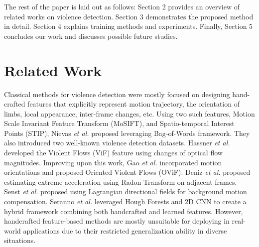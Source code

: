 \documentclass[conference]{IEEEtran}
\begin{document}
The rest of the paper is laid out as follows: Section 2
provides an overview of related works on violence
detection. Section 3 demonstrates the proposed method in detail. Section 4 explains training methods and experiments. Finally, Section 5 concludes our work and discusses possible future studies.



\section{Related Work}

Classical methods for violence detection were mostly focused on designing hand-crafted features that explicitly represent motion trajectory, the orientation of limbs, local appearance, inter-frame changes, etc. Using two such features, Motion Scale Invariant Feature Transform (MoSIFT), and Spatio-temporal Interest Points (STIP), Nievas \emph{et al.} \cite{nievas2011violence} proposed leveraging Bag-of-Words framework. They also introduced two well-known violence detection datasets. Hassner \emph{et al.} \cite{hassnerViF} developed the Violent Flows (ViF) feature using changes of optical flow magnitudes. Improving upon this work, Gao \emph{et al.} \cite{gao2016violence} incorporated motion orientations and proposed Oriented Violent Flows (OViF). Deniz \emph{et al.} \cite{deniz2014fast} proposed estimating extreme acceleration using Radon Transform on adjacent frames. Senst \emph{et al.} \cite{Senst2017CrowdVD} proposed using Lagrangian directional fields for background motion compensation. Seranno \emph{et al.} \cite{serrano2018fight} leveraged Hough Forests and 2D CNN to create a hybrid framework combining both handcrafted and learned features. However, handcrafted feature-based methods are mostly unsuitable for deploying in real-world applications due to their restricted generalization ability in diverse situations.
\end{document}
